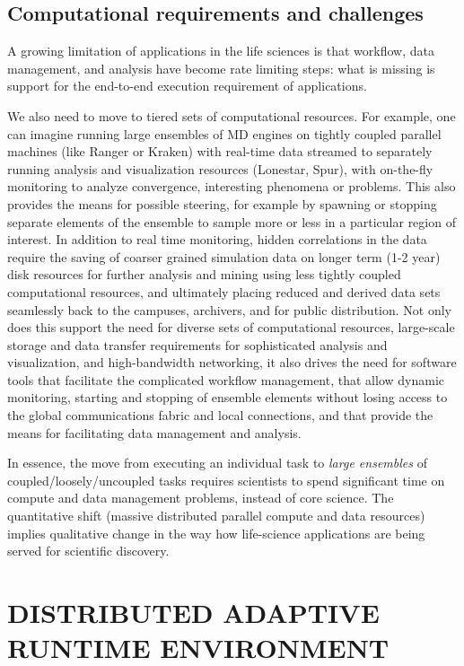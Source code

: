 \documentclass{sig-alternate}
\begin{document}
\subsection{Computational requirements and challenges}

A growing limitation of applications in the life sciences is that
workflow, data management, and analysis have become rate limiting
steps: what is missing is support for the end-to-end execution
requirement of applications.

We also need to move to tiered sets of computational resources.  For
example, one can imagine running large ensembles of MD engines on
tightly coupled parallel machines (like Ranger or Kraken) with
real-time data streamed to separately running analysis and
visualization resources (Lonestar, Spur), with on-the-fly monitoring
to analyze convergence, interesting phenomena or problems.  This also
provides the means for possible steering, for example by spawning or
stopping separate elements of the ensemble to sample more or less in a
particular region of interest.  In addition to real time monitoring,
hidden correlations in the data require the saving of coarser grained
simulation data on longer term (1-2 year) disk resources for further
analysis and mining using less tightly coupled computational
resources, and ultimately placing reduced and derived data sets
seamlessly back to the campuses, archivers, and for public
distribution.  Not only does this support the need for diverse sets of
computational resources, large-scale storage and data transfer
requirements for sophisticated analysis and visualization, and
high-bandwidth networking, it also drives the need for software tools
that facilitate the complicated workflow management, that allow
dynamic monitoring, starting and stopping of ensemble elements without
losing access to the global communications fabric and local
connections, and that provide the means for facilitating data
management and analysis.

In essence, the move from executing an individual task to
\textit{large ensembles} of coupled/loosely/uncoupled tasks requires
scientists to spend significant time on compute and data management
problems, instead of core science.  The quantitative shift (massive
distributed parallel compute and data resources) implies qualitative
change in the way how life-science applications are being served for
scientific discovery.


\section{DISTRIBUTED ADAPTIVE RUNTIME ENVIRONMENT}
\end{document}
